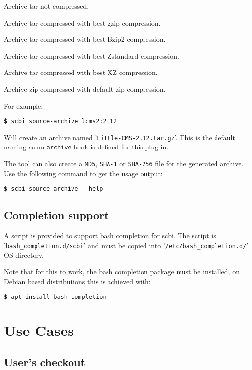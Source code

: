 \documentclass[a4paper,12pt,twoside]{article}
\newcommand{\code}[1]{\texttt{#1}}
\newcommand{\file}[1]{'{\texttt{#1}}'}
\newcommand{\cmd}[1]{\tabto{1cm}\hspace{0.5cm}\texttt{\textbf{\$} #1}}
\let\stdsection\section
\renewcommand\section{\newpage\stdsection}
\newcommand{\ddash}{-{}-}
\begin{document}
\begin{description}[style=nextline]
	\item[.tar] Archive tar not compressed.
	\item[.tar.gz] Archive tar compressed with best gzip compression.
	\item[.tar.bz2] Archive tar compressed with best Bzip2 compression.
	\item[.tar.zst] Archive tar compressed with best Zstandard compression.
	\item[.tar.xz] Archive tar compressed with best XZ compression.
	\item[.zip] Archive zip compressed with default zip compression.
\end{description}

For example:

\cmd{scbi source-archive lcms2:2.12}

Will create an archive named \file{Little-CMS-2.12.tar.gz}. This is the default naming as no \code{archive} hook is defined for this plug-in.

The tool can also create a \code{MD5}, \code{SHA-1} or \code{SHA-256}
file for the generated archive. Use the following command to get the usage output:

\cmd{scbi source-archive \ddash{}help}

\subsection{Completion support}
\label{completion}

A script is provided to support bash completion for scbi. The script is \file{bash\_completion.d/scbi} and must be copied into \file{/etc/bash\_completion.d/} OS directory.

Note that for this to work, the bash completion package must be installed, on Debian based distributions this is achieved with:

\cmd{apt install bash-completion}


\section{Use Cases}

\subsection{User's checkout}
\label{userco}
\end{document}
